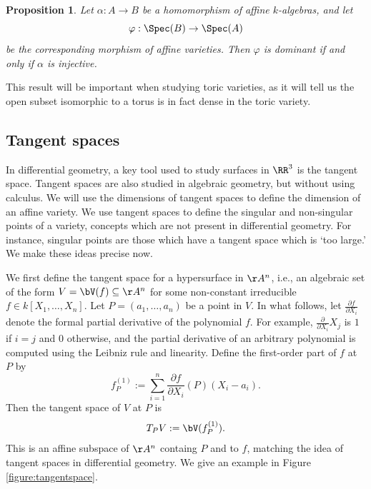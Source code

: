 \documentclass[12pt]{amsart}
\theoremstyle{plain}
\newtheorem{proposition}[theorem]{Proposition}
\begin{document}
\begin{proposition}
Let $\alpha : A \to B$ be a homomorphism of affine $k$-algebras, and let 
$$\varphi: \Spec(B) \to \Spec(A)$$
be the corresponding morphism of affine varieties.
Then $\varphi$ is dominant if and only if $\alpha$ is injective.
\end{proposition}

This result will be important when studying toric varieties, as it will tell us the open subset isomorphic to a torus is in fact dense in the toric variety.





\subsection{Tangent spaces}
In differential geometry, a key tool used to study surfaces in $\RR^3$ is the tangent space.
Tangent spaces are also studied in algebraic geometry, but without using calculus.
We will use the dimensions of tangent spaces to define the dimension of an affine variety.
We use tangent spaces to define the singular and non-singular points of a variety, concepts which are not present in differential geometry.
For instance, singular points are those which have a tangent space which is `too large.'
We make these ideas precise now.

We first define the tangent space for a hypersurface in $\AA^n$, i.e., an algebraic set of the form $V=\bV(f)\subseteq \AA^n$ for some non-constant irreducible $f \in k[X_1,\ldots,X_n]$.
Let $P=(a_1,\ldots,a_n)$ be a point in $V$.
In what follows, let $\frac{\partial f}{\partial X_i}$ denote the formal partial derivative of the polynomial $f$.
For example, $\frac{\partial}{\partial X_i} X_j$ is $1$ if $i=j$ and $0$ otherwise, and the partial derivative of an arbitrary polynomial is computed using the Leibniz rule and linearity.
Define the first-order part of $f$ at $P$ by
\begin{equation}\label{equationtangent}
f_P^{(1)} := \sum_{i=1}^n \frac{\partial f}{\partial X_i} (P) (X_i-a_i).
\end{equation}
Then the tangent space of $V$ at $P$ is
$$T_PV := \bV(f_P^{(1)}).$$
This is an affine subspace of $\AA^n$ containg $P$ and to $f$, matching the idea of tangent spaces in differential geometry.
We give an example in Figure \ref{figure:tangentspace}.
\end{document}
